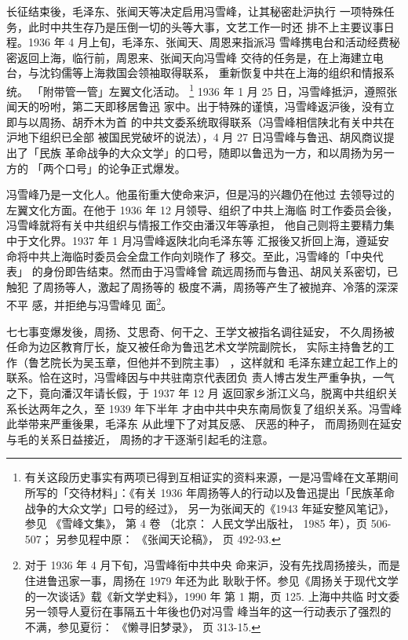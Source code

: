 长征结束後，毛泽东、张闻天等决定启用冯雪峰，让其秘密赴沪执行
一项特殊任务，此时中共生存乃是压倒一切的头等大事，文艺工作一时还
排不上主要议事日程。1936 年 4 月上旬，毛泽东、张闻天、周恩来指派冯
雪峰携电台和活动经费秘密返回上海，临行前，周恩来、张闻天向冯雪峰
交待的任务是，在上海建立电台，与沈钧儒等上海救国会领袖取得联系，
重新恢复中共在上海的组织和情报系统。
「附带管一管」左翼文化活动。
\footnote{有关这段历史事实有两项已得到互相证实的资料来源，一是冯雪峰在文革期间所写的「交待材料」：《有关 1936
年周扬等人的行动以及鲁迅提出「民族革命战争的大众文学」口号的经过》，
另一为张闻天的《1943 年延安整风笔记》，
参见
《雪峰文集》， 第 4 卷
（北京：
人民文学出版社，
1985 年），页 506-507；
另参见程中原：
《张闻天论稿》， 页 492-93.}
1936 年 1 月 25 日，冯雪峰抵沪，遵照张闻天的吩咐，第二天即移居鲁迅
家中。出于特殊的谨慎，冯雪峰返沪後，没有立即与以周扬、胡乔木为首
的中共文委系统取得联系（冯雪峰相信陕北有关中共在沪地下组织已全部
被国民党破坏的说法），4 月 27 日冯雪峰与鲁迅、胡风商议提出了「民族
革命战争的大众文学」的口号，随即以鲁迅为一方，和以周扬为另一方的
「两个口号」的论争正式爆发。

冯雪峰乃是一文化人。他虽衔重大使命来沪，但是冯的兴趣仍在他过 去领导过的
左翼文化方面。在他于 1936 年 12 月领导、组织了中共上海临 时工作委员会後，
冯雪峰就将有关中共组织与情报工作交由潘汉年等承担， 他自己则将主要精力集
中于文化界。1937 年 1 月冯雪峰返陕北向毛泽东等 汇报後又折回上海，遵延安
命将中共上海临时委员会全盘工作向刘晓作了 移交。至此，冯雪峰的「中央代表」
的身份即告结束。然而由于冯雪峰曾 疏远周扬而与鲁迅、胡风关系密切，已触犯
了周扬等人，激起了周扬等的 极度不满，周扬等产生了被抛弃、冷落的深深不平
感，并拒绝与冯雪峰见 面\footnote{对于 1936 年 4 月下旬，冯雪峰衔中共中央
命来沪，没有先找周扬接头，而是住进鲁迅家一事，周扬在 1979 年还为此
耿耿于怀。参见《周扬关于现代文学的一次谈话》载《新文学史料》，1990 年
第 1 期，页 125. 上海中共临 时文委另一领导人夏衍在事隔五十年後也仍对冯雪
峰当年的这一行动表示了强烈的不满，参见夏衍： 《懒寻旧梦录》， 页
313-15.  }。

七七事变爆发後，周扬、艾思奇、何干之、王学文被指名调往延安，
不久周扬被任命为边区教育厅长，旋又被任命为鲁迅艺术文学院副院长，
实际主持鲁艺的工作（鲁艺院长为吴玉章，但他并不到院主事）
，这样就和
毛泽东建立起工作上的联系。恰在这时，冯雪峰因与中共驻南京代表团负
责人博古发生严重争执，一气之下，竟向潘汉年请长假，于 1937 年 12 月
返回家乡浙江义乌，脱离中共组织关系长达两年之久，至 1939 年下半年
才由中共中央东南局恢复了组织关系。冯雪峰此举带来严重後果，毛泽东
从此埋下了对其反感、
厌恶的种子，
而周扬则在延安与毛的关系日益接近，
周扬的才干逐渐引起毛的注意。

